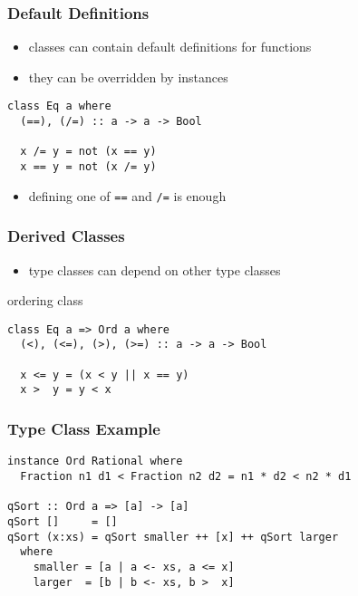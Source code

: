 \documentclass[dvipsnames]{beamer}
\theoremstyle{plain}
\begin{document}
\begin{frame}[fragile]
  \frametitle{Default Definitions}

  \begin{itemize}
    \item classes can contain default definitions for functions
    \item they can be overridden by instances
  \end{itemize}

  \begin{exampleblock}{}
    \begin{lstlisting}
class Eq a where
  (==), (/=) :: a -> a -> Bool

  x /= y = not (x == y)
  x == y = not (x /= y)
    \end{lstlisting}
  \end{exampleblock}

  \begin{itemize}
    \item defining one of \lstinline|==| and \lstinline|/=| is enough
  \end{itemize}
\end{frame}

\begin{frame}[fragile]
  \frametitle{Derived Classes}

  \begin{itemize}
    \item type classes can depend on other type classes
  \end{itemize}

  \begin{exampleblock}{ordering class}
    \begin{lstlisting}
class Eq a => Ord a where
  (<), (<=), (>), (>=) :: a -> a -> Bool

  x <= y = (x < y || x == y)
  x >  y = y < x
    \end{lstlisting}
  \end{exampleblock}
\end{frame}

\begin{frame}[fragile]
  \frametitle{Type Class Example}

  \begin{lstlisting}
instance Ord Rational where
  Fraction n1 d1 < Fraction n2 d2 = n1 * d2 < n2 * d1

qSort :: Ord a => [a] -> [a]
qSort []     = []
qSort (x:xs) = qSort smaller ++ [x] ++ qSort larger
  where
    smaller = [a | a <- xs, a <= x]
    larger  = [b | b <- xs, b >  x]
  \end{lstlisting}
\end{frame}
\end{document}
